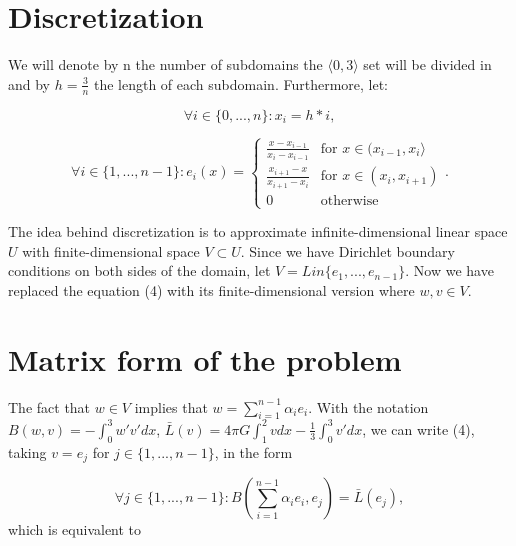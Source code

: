 \documentclass[12pt]{article}
\begin{document}
\section{Discretization}


We will denote by n the number of subdomains the $\langle0, 3 \rangle$ set will be divided in and by $h = \frac{3}{n}$ the length of each subdomain. Furthermore, let: 

\[\forall i \in \{0, ..., n\}: x_i = h*i,\] 

\[\forall i \in \{1, ..., n-1\}:
  e_i (x)=\begin{cases} 
      \frac{x - x_{i-1}}{x_i - x_{i-1}} & \text{for } x \in (x_{i-1}, x_i\rangle\\
      \frac{x_{i+1} - x}{x_{i+1} - x_i} & \text{for } x \in  (x_i, x_{i+1})\\
      0 & \text{otherwise}
   \end{cases}.\]

%

\indent
The idea behind discretization is to approximate infinite-dimensional linear space $U$ with finite-dimensional space $V \subset U$.
Since we have Dirichlet boundary conditions on both sides of the domain, let $V=Lin\{e_1, ..., e_{n-1}\}$. Now we have replaced the equation (4) with its finite-dimensional version where $w, v \in V$.


\section{Matrix form of the problem}


The fact that $w \in V$ implies that $w = \sum_{i=1}^{n-1} \alpha_i e_i$. With the notation $B(w, v) = - \int_0^3 w' v' dx$,
$\bar L(v)=4 \pi G \int_1^2 v dx -  \frac{1}{3} \int_0^3 v' dx$, we can write (4), taking $v=e_j$ for $j \in \{1, ..., n-1\}$, in the form

\[\forall j \in \{1, ..., n-1\}: B(\sum_{i=1}^{n-1} \alpha_i e_i, e_j) = \bar L(e_j),\]
which is equivalent to
\end{document}
